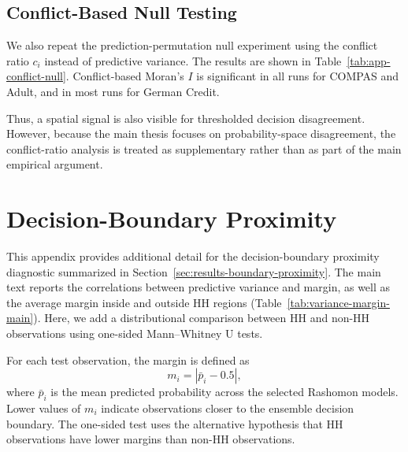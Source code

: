 \subsection{Conflict-Based Null Testing}
\label{app:conflict-null}

We also repeat the prediction-permutation null experiment using the conflict ratio $c_i$
instead of predictive variance. The results are shown in Table~\ref{tab:app-conflict-null}.
Conflict-based Moran's $I$ is significant in all runs for COMPAS and Adult, and in most
runs for German Credit.

\begin{table}[htbp]
\centering
\caption{Conflict-based prediction-permutation null summary by dataset. A run is
counted as significant when the empirical permutation $p$-value for conflict Moran's $I$
is below $0.05$. The null uses $R=100$ prediction-matrix permutations per run. Values
are computed over 10 runs.}
\label{tab:app-conflict-null}

\end{table}

Thus, a spatial signal is also visible for thresholded decision disagreement. However,
because the main thesis focuses on probability-space disagreement, the conflict-ratio
analysis is treated as supplementary rather than as part of the main empirical argument.


\section{Decision-Boundary Proximity}
\label{app:decision-boundary-proximity}

This appendix provides additional detail for the decision-boundary proximity diagnostic
summarized in Section~\ref{sec:results-boundary-proximity}. The main text reports the
correlations between predictive variance and margin, as well as the average margin inside
and outside HH regions (Table~\ref{tab:variance-margin-main}). Here, we add a
distributional comparison between HH and non-HH observations using one-sided
Mann--Whitney U tests.

For each test observation, the margin is defined as
\[
m_i = |\bar{p}_i - 0.5|,
\]
where $\bar{p}_i$ is the mean predicted probability across the selected Rashomon models.
Lower values of $m_i$ indicate observations closer to the ensemble decision boundary.
The one-sided test uses the alternative hypothesis that HH observations have lower
margins than non-HH observations.

